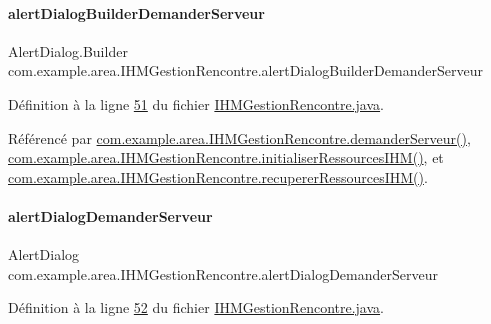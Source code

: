 \paragraph{\texorpdfstring{alert\+Dialog\+Builder\+Demander\+Serveur}{alertDialogBuilderDemanderServeur}}
{\footnotesize\ttfamily Alert\+Dialog.\+Builder com.\+example.\+area.\+I\+H\+M\+Gestion\+Rencontre.\+alert\+Dialog\+Builder\+Demander\+Serveur\hspace{0.3cm}{\ttfamily [private]}}



Définition à la ligne \hyperlink{_i_h_m_gestion_rencontre_8java_source_l00051}{51} du fichier \hyperlink{_i_h_m_gestion_rencontre_8java_source}{I\+H\+M\+Gestion\+Rencontre.\+java}.



Référencé par \hyperlink{_i_h_m_gestion_rencontre_8java_source_l00222}{com.\+example.\+area.\+I\+H\+M\+Gestion\+Rencontre.\+demander\+Serveur()}, \hyperlink{_i_h_m_gestion_rencontre_8java_source_l00142}{com.\+example.\+area.\+I\+H\+M\+Gestion\+Rencontre.\+initialiser\+Ressources\+I\+H\+M()}, et \hyperlink{_i_h_m_gestion_rencontre_8java_source_l00132}{com.\+example.\+area.\+I\+H\+M\+Gestion\+Rencontre.\+recuperer\+Ressources\+I\+H\+M()}.

\mbox{\label{classcom_1_1example_1_1area_1_1_i_h_m_gestion_rencontre_a9e68d97c4b50758ce1d6a2d8a217d5fc}} 
\paragraph{\texorpdfstring{alert\+Dialog\+Demander\+Serveur}{alertDialogDemanderServeur}}
{\footnotesize\ttfamily Alert\+Dialog com.\+example.\+area.\+I\+H\+M\+Gestion\+Rencontre.\+alert\+Dialog\+Demander\+Serveur\hspace{0.3cm}{\ttfamily [private]}}



Définition à la ligne \hyperlink{_i_h_m_gestion_rencontre_8java_source_l00052}{52} du fichier \hyperlink{_i_h_m_gestion_rencontre_8java_source}{I\+H\+M\+Gestion\+Rencontre.\+java}.

